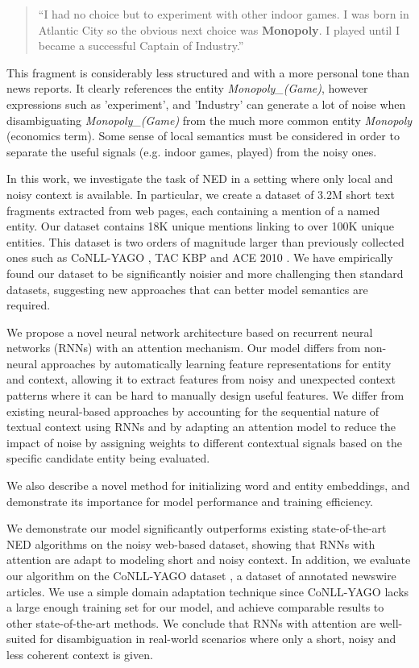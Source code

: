 \documentclass[11pt]{article}
\begin{document}
	\begin{quote}
		``I had no choice but to experiment with other indoor games. I was born in Atlantic City so the obvious next choice was \textbf{Monopoly}. I played until I became a successful Captain of Industry.''
	\end{quote}
	
	This fragment is considerably less structured and with a more personal tone than news reports. It clearly references the entity \textit{Monopoly\_(Game)}, however expressions such as 'experiment', and 'Industry' can generate a lot of noise when disambiguating \textit{Monopoly\_(Game)} from the much more common entity \textit{Monopoly} (economics term). Some sense of local semantics must be considered in order to separate the useful signals (e.g. indoor games, played) from the noisy ones.
	
	In this work, we investigate the task of NED in a setting where only local and noisy context is available. In particular, we create a dataset of 3.2M short text fragments extracted from web pages, each containing a mention of a named entity. Our dataset contains 18K unique mentions linking to over 100K unique entities. This dataset is two orders of magnitude larger than previously collected ones such as CoNLL-YAGO \cite{hoffart2011robust}, TAC KBP \cite{ji2010overview} and ACE 2010 \cite{bentivogli2010extending}. We have empirically found our dataset to be significantly noisier and more challenging then standard datasets, suggesting new approaches that can better model semantics are required.
	
	We propose a novel neural network architecture based on recurrent neural networks (RNNs) with an attention mechanism. Our model differs from non-neural approaches by automatically learning feature representations for entity and context, allowing it to extract features from noisy and unexpected context patterns where it can be hard to manually design useful features. We differ from existing neural-based approaches by accounting for the sequential nature of textual context using RNNs and by adapting an attention model to reduce the impact of noise by assigning weights to different contextual signals based on the specific candidate entity being evaluated.
	
	We also describe a novel method for initializing word and entity embeddings, and demonstrate its importance for model performance and training efficiency. 
	
	We demonstrate our model significantly outperforms existing state-of-the-art NED algorithms on the noisy web-based dataset, showing that RNNs with attention are adapt to modeling short and noisy context. In addition, we evaluate our algorithm on the CoNLL-YAGO dataset \cite{hoffart2011robust}, a dataset of annotated newswire articles. We use a simple domain adaptation technique since CoNLL-YAGO lacks a large enough training set for our model, and achieve comparable results to other state-of-the-art methods. We conclude that RNNs with attention are well-suited for disambiguation in real-world scenarios where only a short, noisy and less coherent context is given.
	
\end{document}
